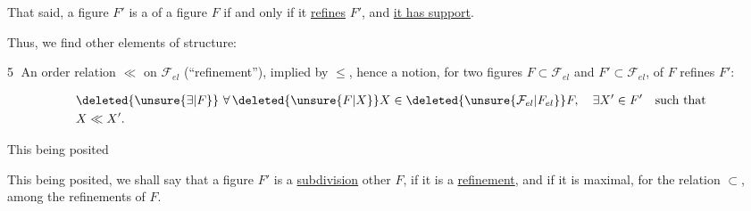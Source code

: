 
That said, a figure $F'$ is a  of a figure $F$ if and only if it \uline{refines} $F'$, and  \uline{it has  support}. 

Thus, we find other elements of structure:

\textcircled{5} An order relation $\ll$ on $\mathcal{F}_{el}$ (``refinement''), implied by $\leq$, hence a notion, for two figures $F\subset\mathcal{F}_{el}$ and $F'\subset\mathcal{F}_{el}$, of $F$ refines $F'$:

\[
\begin{aligned}
&\deleted{\unsure{\exists|F}}\ \forall\,\deleted{\unsure{F|X}}X\in\deleted{\unsure{\mathcal{F}_{el}|F_{el}}}F,\quad \exists X'\in F'\quad\text{such that}\\
&X\ll X'.
\end{aligned}
\]

This being posited





This being posited, we shall say that a figure $F'$ is a \uline{subdivision} other $F$, if it is a \uline{refinement}, and if it is maximal, for the relation $\subset$, among the refinements of $F$.
